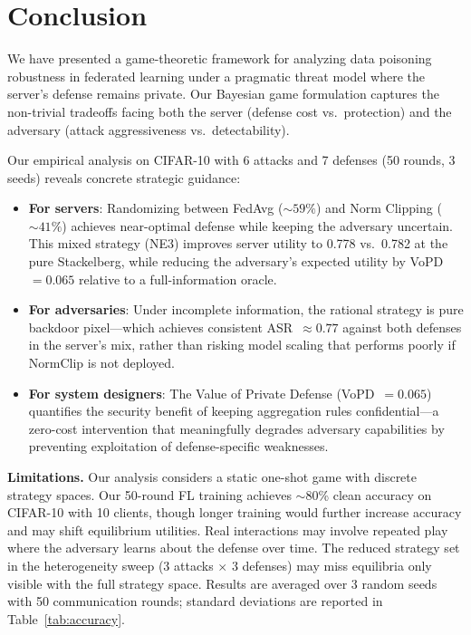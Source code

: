\documentclass{article}
\begin{document}
\section{Conclusion}
\label{sec:conclusion}

We have presented a game-theoretic framework for analyzing data poisoning robustness in federated learning under a pragmatic threat model where the server's defense remains private. Our Bayesian game formulation captures the non-trivial tradeoffs facing both the server (defense cost vs.\ protection) and the adversary (attack aggressiveness vs.\ detectability).

Our empirical analysis on CIFAR-10 with 6 attacks and 7 defenses (50 rounds, 3 seeds) reveals concrete strategic guidance:
\begin{itemize}
    \item \textbf{For servers}: Randomizing between FedAvg (${\sim}59\%$) and Norm Clipping (${\sim}41\%$) achieves near-optimal defense while keeping the adversary uncertain. This mixed strategy (NE3) improves server utility to 0.778 vs.\ 0.782 at the pure Stackelberg, while reducing the adversary's expected utility by VoPD~$= 0.065$ relative to a full-information oracle.
    \item \textbf{For adversaries}: Under incomplete information, the rational strategy is pure backdoor pixel---which achieves consistent ASR~${\approx}0.77$ against both defenses in the server's mix, rather than risking model scaling that performs poorly if NormClip is not deployed.
    \item \textbf{For system designers}: The Value of Private Defense (VoPD~$= 0.065$) quantifies the security benefit of keeping aggregation rules confidential---a zero-cost intervention that meaningfully degrades adversary capabilities by preventing exploitation of defense-specific weaknesses.
\end{itemize}

\textbf{Limitations.} Our analysis considers a static one-shot game with discrete strategy spaces. Our 50-round FL training achieves $\sim$80\% clean accuracy on CIFAR-10 with 10 clients, though longer training would further increase accuracy and may shift equilibrium utilities. Real interactions may involve repeated play where the adversary learns about the defense over time. The reduced strategy set in the heterogeneity sweep (3 attacks $\times$ 3 defenses) may miss equilibria only visible with the full strategy space. Results are averaged over 3 random seeds with 50 communication rounds; standard deviations are reported in Table~\ref{tab:accuracy}.
\end{document}

